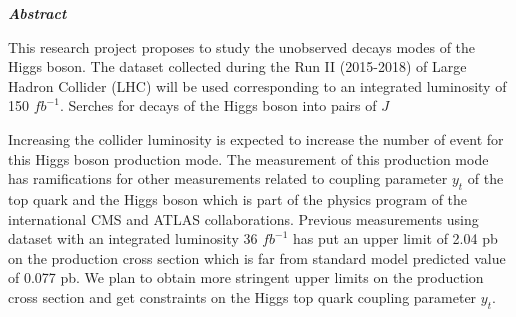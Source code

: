 \documentclass[final,3p]{CSP}
\def\ProjectTitle{}
\begin{document}
\begin{adjustwidth}{1cm}{1cm}

  \begin{center}
    {\Large \ProjectTitle \par}
    \vspace{1cm}
    {\itshape\textbf{Abstract}\par}
  \end{center}
  
  \vspace{1 cm}
 

\onehalfspacing This research project proposes to study the unobserved decays modes of the Higgs boson. The dataset collected during the Run II (2015-2018) of Large Hadron Collider (LHC) will be used corresponding to an integrated luminosity of 150 $fb^{-1}$. Serches for decays of the Higgs boson into pairs of $J$


Increasing the collider luminosity is expected to increase the number of event for this Higgs boson production mode. The measurement of this production mode has ramifications for other measurements related to coupling parameter $y_t$ of the top quark and the Higgs boson which is part of the physics program of the international CMS and ATLAS collaborations. Previous measurements using dataset with an integrated luminosity 36 $fb^{-1}$ has put an upper limit of 2.04 pb on the production cross section which is far from standard model predicted value of 0.077 pb. We plan to obtain more stringent upper limits on the production cross section and get constraints on the Higgs top quark coupling parameter $y_t$. \par


\end{adjustwidth}
\end{document}
